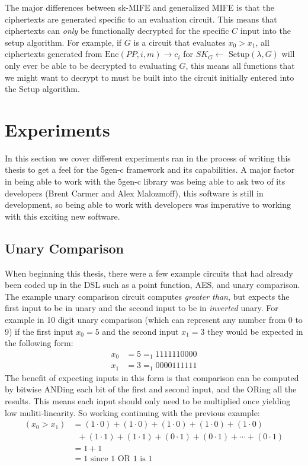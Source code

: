 \documentclass[12pt,twoside]{reedthesis}
\newcommand{\enc}[0]{\text{Enc}}
\begin{document}
   \par The major differences between sk-MIFE and generalized MIFE is that the ciphertexts are generated specific to an evaluation circuit. This means that ciphertexts can \textit{only} be functionally decrypted for the specific $C$ input into the setup algorithm. For example, if $G$ is a circuit that evaluates $x_0>x_1$, all ciphertexts generated from $\enc(PP,i,m) \to c_i$ for $SK_G \leftarrow$ Setup$(\lambda,G)$ will only ever be able to be decrypted to evaluating $G$, this means all functions that we might want to decrypt to must be built into the circuit initially entered into the Setup algorithm.

         
         
         
    \section{Experiments}
    In this section we cover different experiments ran in the process of writing this thesis to get a feel for the 5gen-c framework and its capabilities. A major factor in being able to work with the 5gen-c library was being able to ask two of its developers (Brent Carmer and Alex Malozmoff), this software is still in development, so being able to work with developers was imperative to working with this exciting new software. 
   
   
   \subsection{Unary Comparison}
   \par When beginning this thesis, there were a few example circuits that had already been coded up in the DSL such as a point function, AES, and unary comparison. The example unary comparison circuit computes \textit{greater than}, but expects the first input to be in unary and the second input to be in \textit{inverted} unary. For example in 10 digit unary comparison (which can represent any number from 0 to 9) if the first input $x_0 = 5$ and the second input $x_1=3$ they would be expected in the following form:
   \begin{align*}
   x_0 &= 5 =_1 1111110000 \\
   x_1 &= 3 =_1 0000111111
   \end{align*}
   The benefit of expecting inputs in this form is that comparison can be computed by bitwise ANDing each bit of the first and second input, and the ORing all the results. This means each input should only need to be multiplied once yielding low muliti-linearity. So working continuing with the previous example:
   \begin{align*}
   (x_0> x_1) &= (1\cdot 0) + (1 \cdot 0) + (1 \cdot 0) + (1 \cdot 0) + (1 \cdot 0) \\ & \; \;+ (1 \cdot 1) + (1 \cdot 1) + (0 \cdot 1) +(0 \cdot 1) + \cdots + (0 \cdot 1) \\
   &= 1 + 1\\
   &= 1 \text{ since 1 OR 1 is 1}
   \end{align*}
   
\end{document}
